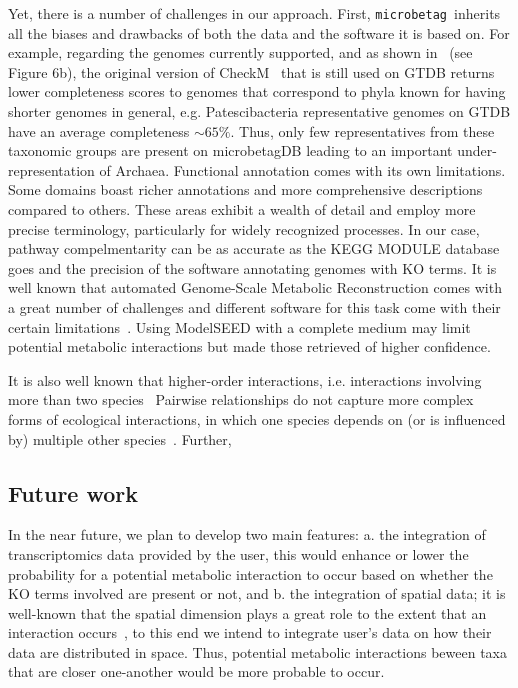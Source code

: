 \documentclass[sn-mathphys,Numbered]{sn-jnl}  %
\theoremstyle{thmstyleone}%
\theoremstyle{thmstyletwo}%
\theoremstyle{thmstylethree}%
\newcommand{\microbetag}{\texttt{microbetag }}
\begin{document}
        Yet, there is a number of challenges in our approach.
        First, \microbetag inherits all the biases and drawbacks of both the data and the software it is based on. 
        For example, regarding the genomes currently supported, and as shown in~\cite{chklovski2023checkm2} (see Figure 6b), the original version of CheckM~\cite{parks2015checkm} that is still used on GTDB returns lower completeness scores to genomes that correspond to phyla known for having shorter genomes in general, e.g. Patescibacteria representative genomes on GTDB have an average completeness $\sim 65\%$.
        Thus, only few representatives from these taxonomic groups are present on microbetagDB leading to an important under-representation of Archaea.
        Functional annotation comes with its own limitations.
        Some domains boast richer annotations and more comprehensive descriptions compared to others. 
        These areas exhibit a wealth of detail and employ more precise terminology, particularly for widely recognized processes.
        In our case, pathway compelmentarity can be as accurate as the KEGG MODULE database goes and the precision of the software annotating genomes with KO terms.
        It is well known that automated Genome-Scale Metabolic Reconstruction comes with a great number of challenges and different software for this task come with their certain limitations~\cite{mendoza2019systematic}. 
        Using ModelSEED with a complete medium may limit potential metabolic interactions but made those retrieved of higher confidence.

        It is also well known that higher-order interactions, i.e. interactions involving more than two species~\cite{zelezniak2015metabolic}
        Pairwise relationships do not capture more complex forms of ecological interactions, in which one species depends on (or is influenced by) multiple other species~\cite{faust2012microbialReviewInteractions}.
        Further, 


    \subsection*{Future work}
    \label{subsec:future}

        In the near future, we plan to develop two main features: 
        a. the integration of transcriptomics data provided by the user, this would enhance or lower the probability for a potential metabolic interaction to occur based on whether the KO terms involved are present or not, and 
        b. the integration of spatial data; it is well-known that the spatial dimension plays a great role to the extent that an interaction occurs~\cite{dal2020short}, to this end we intend to integrate user's data on how their data are distributed in space. 
        Thus, potential metabolic interactions beween taxa that are closer one-another would be more probable to occur.
\end{document}
